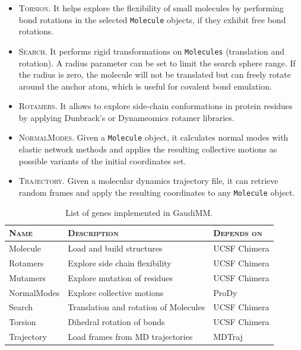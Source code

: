 \begin{itemize}
	\item \textsc{Torsion}. It helps explore the flexibility of small molecules by performing bond rotations in the selected \texttt{Molecule} objects, if they exhibit free bond rotations.

	\item \textsc{Search}. It performs rigid transformations on \texttt{Molecules} (translation and rotation). A radius parameter can be set to limit the search sphere range. If the radius is zero, the molecule will not be translated but can freely rotate around the anchor atom, which is useful for covalent bond emulation.

	\item \textsc{Rotamers}. It allows to explore side-chain conformations in protein residues by applying Dunbrack's\cite{dunbrack1993backbone} or Dynameomics\cite{scouras2011dynameomics} rotamer libraries.

	\item \textsc{NormalModes}. Given a \texttt{Molecule} object, it calculates normal modes with elastic network methods and applies the resulting collective motions as possible variants of the initial coordinates set.

	\item \textsc{Trajectory}. Given a molecular dynamics trajectory file, it can retrieve random frames and apply the resulting coordinates to any \texttt{Molecule} object.
\end{itemize}


\begin{table}[hbtp]
	\caption[List of genes implemented in GaudiMM]{List of genes implemented in GaudiMM.}
	\label{table:gaudi-genes}
\footnotesize
{}%
%
%
\begin{tabularx}{\textwidth}{LMR}
\toprule
\textsc{Name} & \textsc{Description} & \textsc{Depends on} \\
\toprule
 Molecule & Load and build structures & UCSF Chimera \\
\hhline{~~~}
 Rotamers & Explore side chain flexibility & UCSF Chimera \\
\hhline{~~~}
 Mutamers & Explore mutation of residues & UCSF Chimera \\
\hhline{~~~}
 NormalModes & Explore collective motions & ProDy\cite{prody} \\
\hhline{~~~}
 Search & Translation and rotation of Molecules & UCSF Chimera \\
\hhline{~~~}
 Torsion & Dihedral rotation of bonds & UCSF Chimera \\
\hhline{~~~}
 Trajectory & Load frames from MD trajectories & MDTraj\cite{mdtraj} \\
\bottomrule
\end{tabularx}
\end{table}


